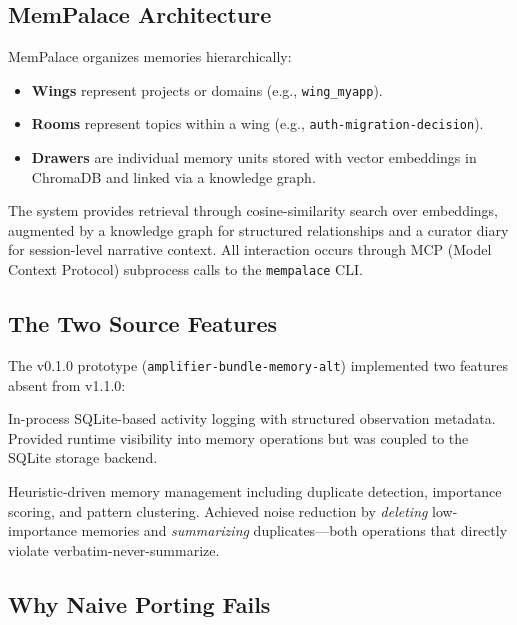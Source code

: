 \documentclass[11pt]{article}
\begin{document}
\subsection{MemPalace Architecture}

MemPalace organizes memories hierarchically:
\begin{itemize}[nosep]
    \item \textbf{Wings} represent projects or domains
          (e.g., \texttt{wing\_myapp}).
    \item \textbf{Rooms} represent topics within a wing
          (e.g., \texttt{auth-migration-decision}).
    \item \textbf{Drawers} are individual memory units stored with
          vector embeddings in ChromaDB and linked via a knowledge graph.
\end{itemize}

The system provides retrieval through cosine-similarity search over
embeddings, augmented by a knowledge graph for structured relationships
and a curator diary for session-level narrative context. All interaction
occurs through MCP (Model Context Protocol) subprocess calls to the
\texttt{mempalace} CLI.

\subsection{The Two Source Features}

The v0.1.0 prototype (\texttt{amplifier-bundle-memory-alt}) implemented
two features absent from v1.1.0:

\begin{description}[nosep]
    \item[Event Broadcast:] In-process SQLite-based activity logging
        with structured observation metadata. Provided runtime visibility
        into memory operations but was coupled to the SQLite storage
        backend.
    \item[Curator Compaction:] Heuristic-driven memory management
        including duplicate detection, importance scoring, and
        pattern clustering. Achieved noise reduction by \emph{deleting}
        low-importance memories and \emph{summarizing} duplicates---both
        operations that directly violate verbatim-never-summarize.
\end{description}

\subsection{Why Naive Porting Fails}
\end{document}
